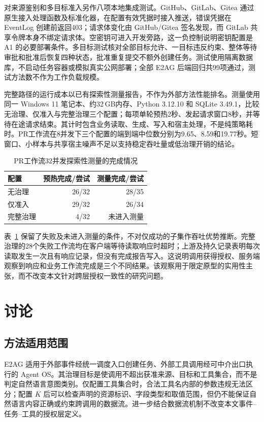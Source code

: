 对来源鉴别和多目标准入另作八项本地集成测试。GitHub、GitLab、Gitea 通过原生接入处理函数及标准化器，在配置有效凭据时接入推送，错误凭据在 EventLog 创建前返回403；请求体变化由 GitHub/Gitea 签名发现，而 GitLab 共享令牌本身不绑定请求体。空密钥可进入开发旁路，这一负控制说明密钥配置是 A1 的必要部署条件。多目标测试核对全部目标允许、一目标违反约束、整体等待审批和批准后恢复四种状态，批准重复提交不额外创建任务。测试使用隔离数据库，不启动任务容器或模拟真实公网部署；全部 E2AG 后端回归共99项通过，测试方法数不作为工作负载规模。

完整路径的运行成本以已有探索性测量报告，不作为外部方法性能排名。测量使用同一 Windows 11 笔记本、约32\,GB内存、Python 3.12.10 和 SQLite 3.49.1，比较无治理、仅准入与完整治理三个配置；每项单轮预热2秒、发起请求窗口8秒，并等待在途请求结束。其计时包含业务读取、生成、写入和宿主处理，不是纯策略耗时。PR工作流在8并发下三个配置的端到端中位数分别为9.65、8.59和19.77秒。短窗口、小样本与共享宿主噪声不足以支持稳定吞吐量或低治理开销的结论。

\begin{table}[htbp]
\centering
\caption{PR工作流32并发探索性测量的完成情况}
\label{tab:exploratory-rr022}
\small
\begin{tabular}{lrr}
\toprule
配置 & 预热完成/尝试 & 测量完成/尝试 \\
\midrule
无治理 & 26/32 & 28/35 \\
仅准入 & 29/32 & 26/34 \\
完整治理 & 4/32 & 未进入测量 \\
\bottomrule
\end{tabular}
\end{table}

表~\ref{tab:exploratory-rr022} 保留了失败及未进入测量的条件，不对仅成功的子集作吞吐优势推断。完整治理的28个失败工作流均在客户端等待读取响应时超时；上游及持久记录表明每次读取发生一次且有响应记录，但没有完成报告写入。这说明调用获得授权、服务端观察到响应和业务工作流完成是三个不同结果。该观察用于限定原型的实用性主张，而不改变本文针对跨层授权一致性的研究问题。

\section{讨论}\label{sec:discussion-v11}

\subsection{方法适用范围}

E2AG 适用于外部事件经统一调度入口创建任务、外部工具调用经可中介出口执行的 Agent OS。其治理目标是使调用不超出获准来源、目标和工具集合，而不是判定自然语言意图类别。仅配置工具集合时，合法工具名内部的参数违规无法区分；配置 $K$ 后可以检查声明的资源标识、字段类型和取值范围，但仍不能保证自然语言内容正确或约束跨调用的数据流。进一步结合数据流机制不改变本文事件--任务--工具的授权层定义。

